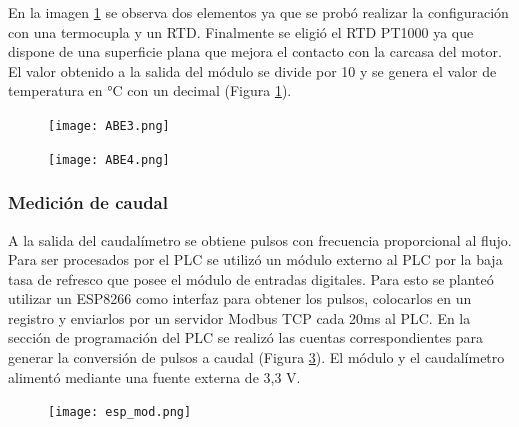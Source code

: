 En la imagen \ref{fig:ABE3} se observa dos elementos ya que se probó realizar la configuración con una termocupla y un RTD. Finalmente se eligió el RTD PT1000 ya que dispone de una superficie plana que mejora el contacto con la carcasa del motor. El valor obtenido a la salida del módulo se divide por 10 y se genera el valor de temperatura en °C con un decimal  (Figura \ref{fig:ABE3}).

\begin{figure}[H]
	\centering
	\texttt{[image: ABE3.png]}
	\label{fig:ABE3}
\end{figure}

\begin{figure}[H]
	\centering
	\texttt{[image: ABE4.png]}
	\label{fig:ABE4}
\end{figure}

\subsubsection{Medición de caudal}
A la salida del caudalímetro se obtiene pulsos con frecuencia proporcional al flujo. Para ser procesados por el PLC se utilizó un módulo externo al PLC por la baja tasa de refresco que posee el módulo de entradas digitales. Para esto se planteó utilizar un ESP8266 como interfaz para obtener los pulsos, colocarlos en un registro y enviarlos por un servidor Modbus TCP cada 20ms al PLC. En la sección de programación del PLC se realizó las cuentas correspondientes para generar la conversión de pulsos a caudal (Figura \ref{fig:modtcp}). El módulo y el caudalímetro alimentó mediante una fuente externa de 3,3 V.
\begin{figure}[htbp]
	\centering
	\texttt{[image: esp\_mod.png]}
	\label{fig:modtcp}
\end{figure}
\clearpage
\newpage

